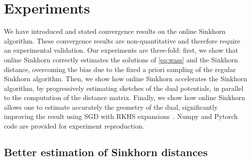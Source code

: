\section{Experiments}\label{sec:exps}

We have introduced and stated convergence results on the online Sinkhorn
algorithm. These convergence results are non-quantitative and therefore require an experimental validation. Our experiments are three-fold: first, we
show that online Sinkhorn correctly estimates the solutions of
\eqref{eq:wass} and the Sinkhorn distance, overcoming the bias due to the fixed
a priori sampling of the regular Sinkhorn algorithm. Then, we show how online
Sinkhorn accelerates the Sinkhorn algorithm, by progressively estimating
sketches of the dual potentials, in parallel to the computation of the distance
matrix. Finally, we show how online Sinkhorn allows one to estimate accurately
the geometry of the dual, significantly improving the result using SGD with RKHS
expansions~\citep{2016-genevay-nips}. Numpy and Pytorch code are provided for experiment reproduction.

\subsection{Better estimation of Sinkhorn distances}\label{sec:exp1}





